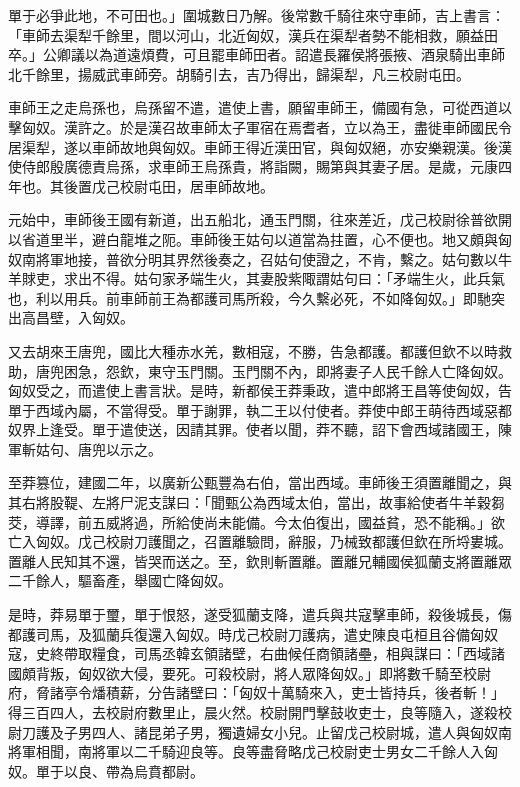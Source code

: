 \begin{pinyinscope}
單于必爭此地，不可田也。」圍城數日乃解。後常數千騎往來守車師，吉上書言：「車師去渠犁千餘里，間以河山，北近匈奴，漢兵在渠犁者勢不能相救，願益田卒。」公卿議以為道遠煩費，可且罷車師田者。詔遣長羅侯將張掖、酒泉騎出車師北千餘里，揚威武車師旁。胡騎引去，吉乃得出，歸渠犁，凡三校尉屯田。

車師王之走烏孫也，烏孫留不遣，遣使上書，願留車師王，備國有急，可從西道以擊匈奴。漢許之。於是漢召故車師太子軍宿在焉耆者，立以為王，盡徙車師國民令居渠犁，遂以車師故地與匈奴。車師王得近漢田官，與匈奴絕，亦安樂親漢。後漢使侍郎殷廣德責烏孫，求車師王烏孫貴，將詣闕，賜第與其妻子居。是歲，元康四年也。其後置戊己校尉屯田，居車師故地。

元始中，車師後王國有新道，出五船北，通玉門關，往來差近，戊己校尉徐普欲開以省道里半，避白龍堆之阨。車師後王姑句以道當為拄置，心不便也。地又頗與匈奴南將軍地接，普欲分明其界然後奏之，召姑句使證之，不肯，繫之。姑句數以牛羊賕吏，求出不得。姑句家矛端生火，其妻股紫陬謂姑句曰：「矛端生火，此兵氣也，利以用兵。前車師前王為都護司馬所殺，今久繫必死，不如降匈奴。」即馳突出高昌壁，入匈奴。

又去胡來王唐兜，國比大種赤水羌，數相寇，不勝，告急都護。都護但欽不以時救助，唐兜困急，怨欽，東守玉門關。玉門關不內，即將妻子人民千餘人亡降匈奴。匈奴受之，而遣使上書言狀。是時，新都侯王莽秉政，遣中郎將王昌等使匈奴，告單于西域內屬，不當得受。單于謝罪，執二王以付使者。莽使中郎王萌待西域惡都奴界上逢受。單于遣使送，因請其罪。使者以聞，莽不聽，詔下會西域諸國王，陳軍斬姑句、唐兜以示之。

至莽篡位，建國二年，以廣新公甄豐為右伯，當出西域。車師後王須置離聞之，與其右將股鞮、左將尸泥支謀曰：「聞甄公為西域太伯，當出，故事給使者牛羊穀芻茭，導譯，前五威將過，所給使尚未能備。今太伯復出，國益貧，恐不能稱。」欲亡入匈奴。戊己校尉刀護聞之，召置離驗問，辭服，乃械致都護但欽在所埒婁城。置離人民知其不還，皆哭而送之。至，欽則斬置離。置離兄輔國侯狐蘭支將置離眾二千餘人，驅畜產，舉國亡降匈奴。

是時，莽易單于璽，單于恨怒，遂受狐蘭支降，遣兵與共寇擊車師，殺後城長，傷都護司馬，及狐蘭兵復還入匈奴。時戊己校尉刀護病，遣史陳良屯桓且谷備匈奴寇，史終帶取糧食，司馬丞韓玄領諸壁，右曲候任商領諸壘，相與謀曰：「西域諸國頗背叛，匈奴欲大侵，要死。可殺校尉，將人眾降匈奴。」即將數千騎至校尉府，脅諸亭令燔積薪，分告諸壁曰：「匈奴十萬騎來入，吏士皆持兵，後者斬！」得三百四人，去校尉府數里止，晨火然。校尉開門擊鼓收吏士，良等隨入，遂殺校尉刀護及子男四人、諸昆弟子男，獨遺婦女小兒。止留戊己校尉城，遣人與匈奴南將軍相聞，南將軍以二千騎迎良等。良等盡脅略戊己校尉吏士男女二千餘人入匈奴。單于以良、帶為烏賁都尉。


\end{pinyinscope}
